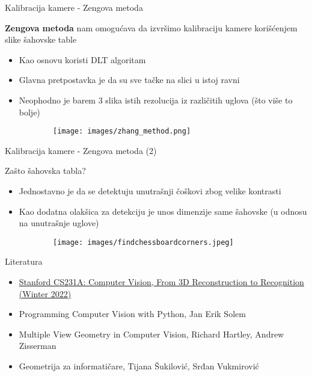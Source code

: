 \documentclass[bookmarks=true,bookmarksopen=true,pdfborder={0 0 0},pdfhighlight={/N},linkbordercolor={.5 .5 .5},implicit=false,unicode,xcolor={table}]{beamer}
\begin{document}
\begin{frame}{Kalibracija kamere - Zengova metoda}

  \textbf{Zengova metoda} nam omogućava da izvršimo kalibraciju kamere korišćenjem slike šahovske table

  \begin{itemize}
    \item Kao osnovu koristi DLT algoritam
    \item Glavna pretpostavka je da su sve tačke na slici u istoj ravni
    \item Neophodno je barem 3 slika istih rezolucija iz različitih uglova (što više to bolje)
  \end{itemize}
  \begin{figure}
    \begin{subfigure}{7cm}
      \texttt{[image: images/zhang\_method.png]}
    \end{subfigure}
  \end{figure}

\end{frame}

\begin{frame}{Kalibracija kamere - Zengova metoda (2)}

  Zašto šahovska tabla? 
  \begin{itemize}
    \item Jednostavno je da se detektuju unutrašnji čoškovi zbog velike kontrasti
    \item Kao dodatna olakšica za detekciju je unos dimenzije same šahovske (u odnosu na unutrašnje uglove)
  \end{itemize}

  \begin{figure}
    \begin{subfigure}{7cm}
      \texttt{[image: images/findchessboardcorners.jpeg]}
    \end{subfigure}
  \end{figure}

\end{frame}

\begin{frame}{Literatura}

  \begin{itemize}
    \item \href{https://web.stanford.edu/class/cs231a/}{Stanford CS231A: Computer Vision, From 3D Reconstruction to Recognition (Winter 2022)}
    \item Programming Computer Vision with Python, Jan Erik Solem
    \item Multiple View Geometry in Computer Vision, Richard Hartley, Andrew Zisserman
    \item Geometrija za informatičare, Tijana Šukilović, Srđan Vukmirović
  \end{itemize}

\end{frame}
\end{document}
